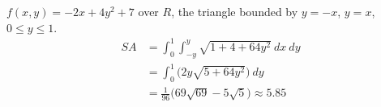 {$f(x,y) = -2x+4y^2+7$ over $R$, the triangle bounded by $y=-x$, $y=x$, $0\leq y\leq 1$.
}
{
\begin{align*}SA &= \int_{0}^{1}\int_{-y}^{y} \sqrt{1+ 4+64y^2}\ dx\ dy\\
		&= \int_0^{1}\big(2y\sqrt{5+64y^2}\big)\ dy \\
		&= \frac1{96}\big(69\sqrt{69}-5\sqrt{5}\big)\approx 5.85
\end{align*}
}